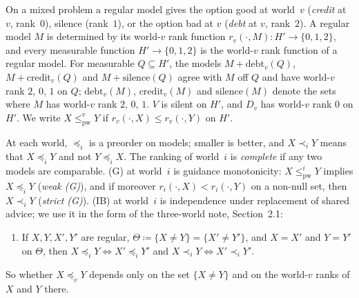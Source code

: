 \documentclass[11pt]{article}
\theoremstyle{definition}\newtheorem{definition}[theorem]{Definition}
\theoremstyle{remark}\newtheorem{remark}[theorem]{Remark}
\newcommand{\debt}{\mathrm{debt}}
\newcommand{\cred}{\mathrm{credit}}
\newcommand{\sil}{\mathrm{silence}}
\newcommand{\pw}{\mathrm{pw}}
\begin{document}
On a mixed problem a regular model gives the option good at world~$v$
(\emph{credit} at $v$, rank~$0$), silence (rank~$1$), or the option bad at
$v$ (\emph{debt} at $v$, rank~$2$). A regular model $M$ is determined by
its world-$v$ rank function $r_v(\cdot,M)\colon H'\to\{0,1,2\}$, and every
measurable function $H'\to\{0,1,2\}$ is the world-$v$ rank function of a
regular model. For measurable $Q\subseteq H'$, the models $M+\debt_v(Q)$,
$M+\cred_v(Q)$ and $M+\sil(Q)$ agree with $M$ off $Q$ and have world-$v$
rank $2$, $0$, $1$ on $Q$; $\debt_v(M)$, $\cred_v(M)$ and $\sil(M)$ denote
the sets where $M$ has world-$v$ rank $2$, $0$, $1$. $V$ is silent on $H'$,
and $D_v$ has world-$v$ rank $0$ on $H'$. We write $X\le^v_\pw Y$ if
$r_v(\cdot,X)\le r_v(\cdot,Y)$ on $H'$.

At each world, $\preceq_i$ is a preorder on models; smaller is better, and
$X\prec_iY$ means that $X\preceq_iY$ and not $Y\preceq_iX$. The ranking of
world~$i$ is \emph{complete} if any two models are comparable. (G) at
world~$i$ is guidance monotonicity: $X\le^i_\pw Y$ implies $X\preceq_iY$
(\emph{weak (G)}), and if moreover $r_i(\cdot,X)<r_i(\cdot,Y)$ on a
non-null set, then $X\prec_iY$ (\emph{strict (G)}). (IB) at world~$i$ is
independence under replacement of shared advice; we use it in the form of
the three-world note, Section~2.1:
\begin{enumerate}[label=(IB$'$),leftmargin=*]
\item If $X,Y,X',Y'$ are regular, $\Theta\coloneqq\{X\ne Y\}=\{X'\ne
Y'\}$, and $X=X'$ and $Y=Y'$ on $\Theta$, then $X\preceq_iY\iff
X'\preceq_iY'$ and $X\prec_iY\iff X'\prec_iY'$.
\end{enumerate}
So whether $X\preceq_vY$ depends only on the set $\{X\ne Y\}$ and on the
world-$v$ ranks of $X$ and $Y$ there.
\end{document}
